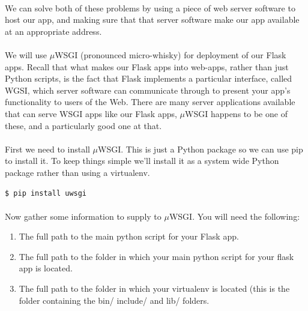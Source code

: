 \documentclass[12pt, a4paper, oneside]{book}
\begin{document}
{\paragraph{} We can solve both of these problems by using a piece of web server software to host our app, and making sure that that server software make our app available at an appropriate address.

\paragraph{} We will use $\mu$WSGI (pronounced micro-whisky) for deployment of our Flask apps. Recall that what makes our Flask apps into web-apps, rather than just Python scripts, is the fact that Flask implements a particular interface, called WGSI, which server software can communicate through to present your app's functionality to users of the Web. There are many server applications available that can serve WSGI apps like our Flask apps, $\mu$WSGI happens to be one of these, and a particularly good one at that.

\paragraph{} First we need to install $\mu$WSGI. This is just a Python package so we can use pip to install it. To keep things simple we'll install it as a system wide Python package rather than using a virtualenv.

\begin{lstlisting}[style=DOS]
    $ pip install uwsgi
\end{lstlisting}


\paragraph{} Now gather some information to supply to $\mu$WSGI. You will need the following:

\begin{enumerate}
\item The full path to the main python script for your Flask app.
\item The full path to the folder in which your main python script for your flask app is located.
\item The full path to the folder in which your virtualenv is located (this is the folder containing the bin/ include/ and lib/ folders.
\end{enumerate}

}
\end{document}
